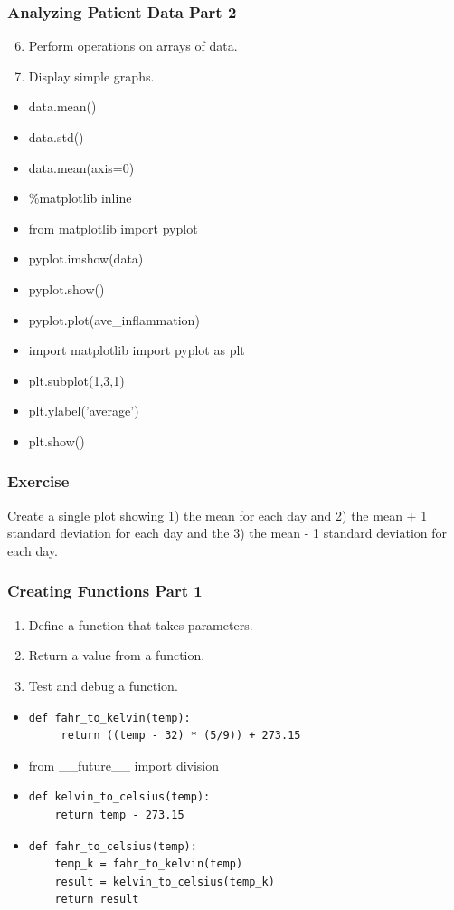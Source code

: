 \documentclass[xcolor=dvipsnames]{beamer}
\begin{document}
\begin{frame}
\frametitle{Analyzing Patient Data Part 2}
\begin{enumerate}
\setcounter{enumi}{5}
\item    Perform operations on arrays of data.
\item    Display simple graphs.
\end{enumerate}
\begin{multicols}{2}
\begin{itemize}
\item data.mean()
\item data.std()
\item data.mean(axis=0)
\item \%matplotlib inline
\item from matplotlib import pyplot
\item pyplot.imshow(data)
\item pyplot.show()
\item pyplot.plot(ave\_inflammation)
\item import matplotlib import pyplot as plt
\item plt.subplot(1,3,1)
\item plt.ylabel('average')
\item plt.show()
\end{itemize}
\end{multicols}
\end{frame}


\begin{frame}
\frametitle{Exercise}
Create a single plot showing 1) the mean for each day and 2) the mean + 1 standard deviation for each day and the 3) the mean - 1 standard deviation for each day.
\end{frame}

\begin{frame}[fragile]
\frametitle{Creating Functions Part 1}
\begin{enumerate}
\item    Define a function that takes parameters.
\item    Return a value from a function.
\item    Test and debug a function.
\end{enumerate}
\begin{itemize}
\item
\begin{verbatim}
def fahr_to_kelvin(temp):
     return ((temp - 32) * (5/9)) + 273.15
\end{verbatim}
\item from \_\_future\_\_ import division
\item
\begin{verbatim}
def kelvin_to_celsius(temp):
    return temp - 273.15
\end{verbatim}
\item
\begin{verbatim}
def fahr_to_celsius(temp):
    temp_k = fahr_to_kelvin(temp)
    result = kelvin_to_celsius(temp_k)
    return result
\end{verbatim}
\end{itemize}
\end{frame}
\end{document}
